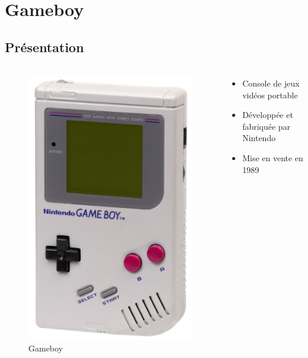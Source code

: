 \documentclass{beamer}
\begin{document}

\section{Gameboy}
\subsection{Présentation}
\begin{frame}
	\frametitle{\secname}
  \framesubtitle{\subsecname}
  \begin{columns}[T]
		\begin{column}{.30\textwidth}
			\begin{figure}
				\includegraphics[width=.6\textwidth]{images/gameboy.jpg}
				\caption{Gameboy}
			\end{figure}
		\end{column}
		\begin{column}{.70\textwidth}
			\begin{itemize}
				\item Console de jeux vidéos portable
        \item Développée et fabriquée par Nintendo
				\item Mise en vente en 1989
      \end{itemize}
		\end{column}
	\end{columns}
\end{frame}
\end{document}
